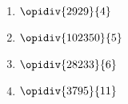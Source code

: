\exo{}


\begin{multicols}{2}
\begin{enumerate}[itemsep=5em]
	
	\item $\opidiv{2929}{4}$
	\item $\opidiv{102350}{5}$
	\item $\opidiv{28233}{6}$
	\item $\opidiv{3795}{11}$

\end{enumerate}
\end{multicols}
